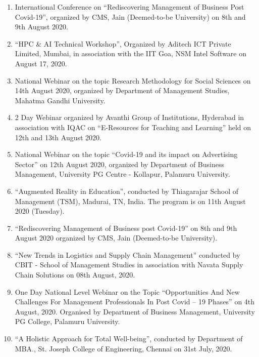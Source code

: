 \documentclass[10pt]{article}
\begin{document}
\begin{enumerate} 

\item International Conference on \enquote{Rediscovering Management of Business Post Covid-19}, organized by CMS, Jain (Deemed-to-be University) on 8th and 9th August 2020.

\item \enquote{HPC & AI Technical Workshop}, Organized by Aditech ICT Private Limited, Mumbai, in association with the IIT Goa, NSM Intel Software on August 17, 2020.

\item National Webinar on the topic Research Methodology for Social Sciences on 14th August 2020, organized by Department of Management Studies, Mahatma Gandhi University.

\item 2 Day Webinar organized by Avanthi Group of Institutions, Hyderabad in association with IQAC on \enquote{E-Resources for Teaching and Learning} held on 12th and 13th August 2020.

\item National Webinar on the topic \enquote{Covid-19 and its impact on Advertising Sector} on 12th August 2020, organized by Department of Business Management, University PG Centre - Kollapur, Palamuru University.

\item \enquote{Augmented Reality in Education}, conducted by Thiagarajar School of Management (TSM), Madurai, TN, India. The program is on 11th August 2020 (Tuesday).

\item \enquote{Rediscovering Management of Business post Covid-19} on 8th and 9th August 2020 organized by CMS, Jain (Deemed-to-be University).

\item \enquote{New Trends in Logistics and Supply Chain Management} conducted by CBIT - School of Management Studies in association with Navata Supply Chain Solutions on 08th August, 2020.

\item One Day National Level Webinar on the Topic \enquote{Opportunities And New Challenges For Management Professionals In Post Covid – 19 Phases} on 4th August, 2020. Organised by Department of Business Management, University PG College, Palamuru University.

\item \enquote{A Holistic Approach for Total Well-being}, conducted by Department of MBA., St. Joseph College of Engineering, Chennai on 31st July, 2020.


\end{enumerate}
\end{document}
